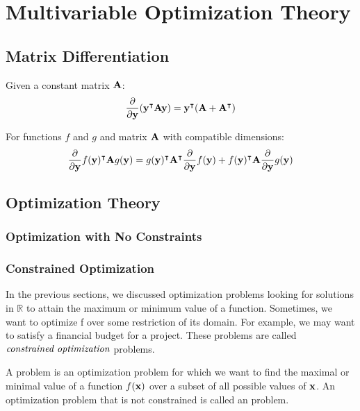 
\chapter{Multivariable Optimization Theory}

\section{Matrix Differentiation}

\begin{theorem}
    Given a constant matrix $\MA$:
    $$\frac{\partial}{\partial\vy}(\vy^\intercal\MA\vy) = \vy^\intercal(\MA + \MA^\intercal)$$
\end{theorem}
\begin{theorem}
    For functions $f$ and $g$ and matrix $\MA$ with compatible dimensions:
    $$\frac{\partial}{\partial\vy}f(\vy)^\intercal\MA g(\vy) = g(\vy)^\intercal\MA^\intercal\frac{\partial}{\partial\vy}f(\vy) + f(\vy)^\intercal\MA\frac{\partial}{\partial\vy}g(\vy)$$
\end{theorem}

\section{Optimization Theory} \label{optim}

\subsection{Optimization with No Constraints} 

\subsection{Constrained Optimization}

In the previous sections, we discussed optimization problems looking for solutions in $\mathbb{R}$ to attain the maximum or minimum value of a function. Sometimes, we want to optimize f over some restriction of its domain. For example, we may want to satisfy a financial budget for a project. These problems are called $\define{constrained optimization}$ problems.

\begin{definition}\label{def_constrained_optimization} 
A  problem is an optimization problem for which we want to find the maximal or minimal value of a function $f(\vx)$ over a subset of all possible values of $\vx$. An optimization problem that is not constrained is called an  problem.
\end{definition}

